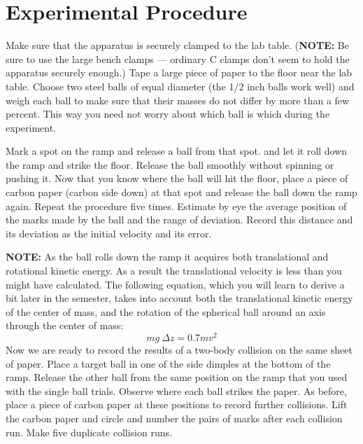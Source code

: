 \section*{Experimental Procedure}
     Make sure that the apparatus is securely clamped to the lab table.
({\bf NOTE:}  Be sure to use the large bench clamps --- ordinary C clamps don't
seem to hold the apparatus securely enough.)  Tape a large piece of
paper to the floor near the lab table.  Choose two
steel balls of equal diameter (the 1/2 inch balls work well) and weigh
each ball to make sure that their masses do not differ by more than a
few percent.  This way you need not worry about which ball is which
during the experiment.

    
Mark a spot on the ramp and  release a ball from that spot.
and let it roll down the
ramp and strike the floor.  Release the ball smoothly without spinning or
pushing it. 
Now that you know where the ball will hit the floor, place a piece of
carbon paper (carbon side down) at that spot and release the
ball down the ramp again.    Repeat the procedure five times.
Estimate by eye the average
position of the marks made by the ball and the range of deviation.  
Record this distance and its deviation as
the initial velocity and its error.

{\bf NOTE:}  As the ball rolls down the ramp it acquires both translational
       and rotational kinetic energy.  As a result the translational
velocity is less than you might have calculated. The following equation, which you
       will learn to derive a bit later in the semester, takes into
       account both the translational kinetic energy of the center of
       mass, and the rotation of the spherical ball around an axis
       through the center of mass:
\[
mg \: \Delta z = 0.7 m v^{2}
\]
     Now we are ready to record the results of a two-body collision on
the same sheet of paper.  Place a target ball in one of the side dimples
at the bottom of the ramp.  Release the other ball from the same position on
the ramp that you used with the single ball trials.
Observe where each ball strikes the paper.  As before, place a
piece of carbon paper at these positions to record further collisions.
Lift the carbon paper and circle and number the pairs of marks after each
collision run.  Make five duplicate collision runs.

